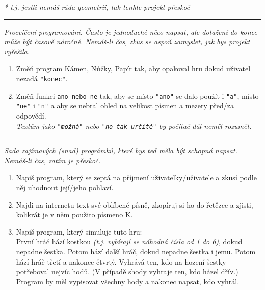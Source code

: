 \documentclass[a4paper,10pt]{article}
\newcommand\startsection[1]{
     \vspace{0.2ex}
    \hrule
    {\fontspec{Oxygen} \tiny
     \vspace{-1ex}
     \emph{#1}
     \vspace{-1.5em}
    }
}
\begin{document}
\begin{enumerate}[resume]
    \emph{\small
        * t.j. jestli nemáš ráda geometrii, tak tenhle projekt přeskoč
    }

\end{enumerate}

\startsection{Procvičení programování. Často je jednoduché něco napsat, ale dotažení do konce může být časově náročné. Nemáš-li čas, zkus se aspoň zamyslet, jak bys projekt vyřešila.}

\begin{enumerate}[resume]

\item Změň program Kámen, Nůžky, Papír tak, aby opakoval hru dokud
    uživatel nezadá \texttt{"konec"}.

\item Změň funkci \texttt{ano\_nebo\_ne} tak,
    aby se místo \texttt{"ano"} se dalo použít i \texttt{"a"},
    místo \texttt{"ne"} i \texttt{"n"}
    a aby se nebral ohled na velikost písmen a mezery před/za odpovědí.
    \\\emph{\small
        Textům jako \texttt{"možná"} nebo \texttt{"no tak určitě"}
        by počítač dál neměl rozumět.
    }

\end{enumerate}

\startsection{Sada zajímavých (snad) prográmků, které bys teď měla být schopná napsat. Nemáš-li čas, zatím je přeskoč.}

\begin{enumerate}[resume]

\item Napiš program, který se zeptá na příjmení uživatelky/uživatele
    a zkusí podle něj uhodnout její/jeho pohlaví.

\item Najdi na internetu text své oblíbené písně, zkopíruj si ho do řetězce
    a zjisti, kolikrát je v něm použito písmeno K.

\item Napiš program, který simuluje tuto hru:
    \\První hráč hází kostkou
    \emph{(t.j. vybírají se náhodná čísla od 1 do 6)},
    dokud nepadne šestka.
    Potom hází další hráč, dokud nepadne šestka i jemu.
    Potom hází hráč třetí a nakonec čtvrtý.
    Vyhrává ten, kdo na hození šestky potřeboval nejvíc hodů.
    (V případě shody vyhraje ten, kdo házel dřív.)
    \\Program by měl vypisovat všechny hody a nakonec napsat, kdo vyhrál.

\end{enumerate}
\end{document}

